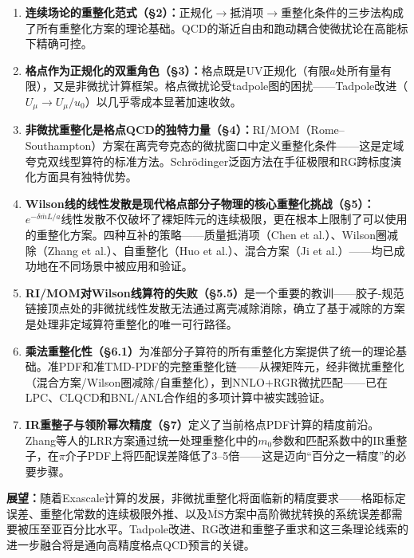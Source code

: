 \documentclass[12pt,a4paper]{ctexart}
\theoremstyle{definition}
\begin{document}
\begin{enumerate}[leftmargin=*]

    \item \textbf{连续场论的重整化范式（§2）：}正规化$\to$抵消项$\to$重整化条件的三步法构成了所有重整化方案的理论基础。QCD的渐近自由和跑动耦合使微扰论在高能标下精确可控。

    \item \textbf{格点作为正规化的双重角色（§3）：}格点既是UV正规化（有限$a$处所有量有限），又是非微扰计算框架。格点微扰论受tadpole图的困扰——Tadpole改进（$U_\mu \to U_\mu/u_0$）以几乎零成本显著加速收敛。

    \item \textbf{非微扰重整化是格点QCD的独特力量（§4）：}RI/MOM（Rome--Southampton）方案在离壳夸克态的微扰窗口中定义重整化条件——这是定域夸克双线型算符的标准方法。Schr\"odinger泛函方法在手征极限和RG跨标度演化方面具有独特优势。

    \item \textbf{Wilson线的线性发散是现代格点部分子物理的核心重整化挑战（§5）：}$e^{-\delta\bar m L/a}$线性发散不仅破坏了裸矩阵元的连续极限，更在根本上限制了可以使用的重整化方案。四种互补的策略——质量抵消项（Chen et al.）、Wilson圈减除（Zhang et al.）、自重整化（Huo et al.）、混合方案（Ji et al.）——均已成功地在不同场景中被应用和验证。

    \item \textbf{RI/MOM对Wilson线算符的失败（§5.5）}是一个重要的教训——胶子-规范链接顶点处的非微扰线性发散无法通过离壳减除消除，确立了基于减除的方案是处理非定域算符重整化的唯一可行路径。

    \item \textbf{乘法重整化性（§6.1）}为准部分子算符的所有重整化方案提供了统一的理论基础。准PDF和准TMD-PDF的完整重整化链——从裸矩阵元，经非微扰重整化（混合方案/Wilson圈减除/自重整化），到NNLO+RGR微扰匹配——已在LPC、CLQCD和BNL/ANL合作组的多项计算中被实践验证。

    \item \textbf{IR重整子与领阶幂次精度（§7）}定义了当前格点PDF计算的精度前沿。Zhang等人的LRR方案通过统一处理重整化中的$m_0$参数和匹配系数中的IR重整子，在$\pi$介子PDF上将匹配误差降低了3--5倍——这是迈向``百分之一精度''的必要步骤。

\end{enumerate}

\textbf{展望：}随着Exascale计算的发展，非微扰重整化将面临新的精度要求——格距标定误差、重整化常数的连续极限外推、以及$\overline{\text{MS}}$方案中高阶微扰转换的系统误差都需要被压至亚百分比水平。Tadpole改进、RG改进和重整子重求和这三条理论线索的进一步融合将是通向高精度格点QCD预言的关键。
\end{document}
